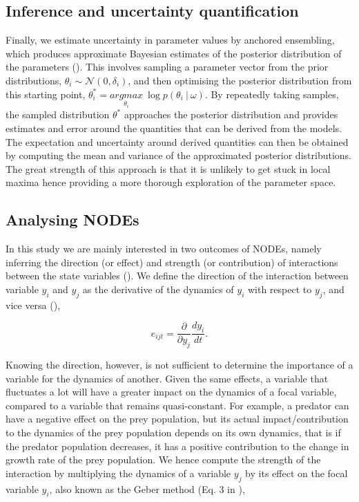 \documentclass[11pt, oneside]{article}
\begin{document}
\subsection{Inference and uncertainty quantification}

Finally, we estimate uncertainty in parameter values by anchored ensembling, which produces approximate Bayesian estimates of the posterior distribution of the parameters (\cite{Pearce2018}).
This involves sampling a parameter vector from the prior distributions, $\theta_{i} \sim \mathcal{N}(0,\delta_{i})$, and then optimising the posterior distribution from this starting point, $\theta^*_i = \underset{\theta_i}{argmax}~\log p(\theta_i~|~\omega)$.
By repeatedly taking samples, the sampled distribution $\theta^*$ approaches the posterior distribution and provides estimates and error around the quantities that can be derived from the models.
The expectation and uncertainty around derived quantities can then be obtained by computing the mean and variance of the approximated posterior distributions.
The great strength of this approach is that it is unlikely to get stuck in local maxima hence providing a more thorough exploration of the parameter space.

\subsection{Analysing NODEs}

In this study we are mainly interested in two outcomes of NODEs, namely inferring the direction (or effect) and strength (or contribution) of interactions between the state variables (\cite{Bonnaffe2021a}).
We define the direction of the interaction between variable $y_i$ and $y_j$ as the derivative of the dynamics of $y_i$ with respect to $y_j$, and vice versa (\cite{Sugihara2012}), 

\vspace{-0.5cm}
\begin{equation}
    e_{ijt} = \frac{\partial}{\partial y_j} \frac{dy_i}{dt}.
\end{equation}

Knowing the direction, however, is not sufficient to determine the importance of a variable for the dynamics of another. 
Given the same effects, a variable that fluctuates a lot will have a greater impact on the dynamics of a focal variable, compared to a variable that remains quasi-constant.
For example, a predator can have a negative effect on the prey population, but its actual impact/contribution to the dynamics of the prey population depends on its own dynamics, that is if the predator population decreases, it has a positive contribution to the change in growth rate of the prey population. 
We hence compute the strength of the interaction by multiplying the dynamics of a variable $y_j$ by its effect on the focal variable $y_i$, also known as the Geber method (Eq. 3 in \cite{Hairston2005}),
\end{document}
